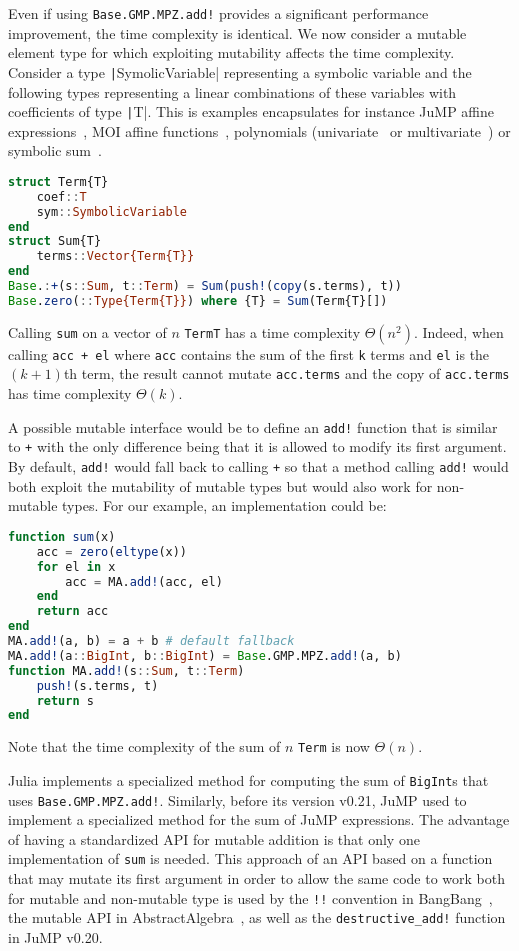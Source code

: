 \documentclass{juliacon}
\begin{document}
Even if using \lstinline|Base.GMP.MPZ.add!| provides a significant performance improvement,
the time complexity is identical.
We now consider a mutable element type for which exploiting mutability affects the time complexity.
Consider a type \texttt|SymolicVariable| representing a symbolic variable and the following types representing a linear combinations of these variables with coefficients of type \texttt|T|.
This is examples encapsulates for instance JuMP affine expressions~\cite{dunning2017jump}, MOI affine functions~\cite{legat2021mathoptinterface}, polynomials (univariate~\cite{verzani2021polynomials} or multivariate~\cite{legat2021multivariatepolynomials}) or symbolic sum~\cite{gowda2021high}.
\begin{lstlisting}[language = Julia]
struct Term{T}
    coef::T
    sym::SymbolicVariable
end
struct Sum{T}
    terms::Vector{Term{T}}
end
Base.:+(s::Sum, t::Term) = Sum(push!(copy(s.terms), t))
Base.zero(::Type{Term{T}}) where {T} = Sum(Term{T}[])
\end{lstlisting}
Calling \texttt{sum} on a vector of $n$ \texttt{Term{T}} has a time complexity $\Theta(n^2)$.
Indeed, when calling \lstinline|acc + el| where \lstinline|acc| contains the sum of the first \lstinline|k| terms and \lstinline|el| is the $(k+1)$th term,
the result cannot mutate \lstinline|acc.terms| and the copy of \lstinline|acc.terms| has time complexity $\Theta(k)$.

A possible mutable interface would be to define an \lstinline|add!| function
that is similar to \lstinline|+| with the only difference being that it
is allowed to modify its first argument.
By default, \lstinline|add!| would fall back to calling \lstinline|+|
so that a method calling \lstinline|add!| would both exploit the mutability
of mutable types but would also work for non-mutable types.
For our example, an implementation could be:
\begin{lstlisting}[language = Julia]
function sum(x)
    acc = zero(eltype(x))
    for el in x
        acc = MA.add!(acc, el)
    end
    return acc
end
MA.add!(a, b) = a + b # default fallback
MA.add!(a::BigInt, b::BigInt) = Base.GMP.MPZ.add!(a, b)
function MA.add!(s::Sum, t::Term)
    push!(s.terms, t)
    return s
end
\end{lstlisting}
Note that the time complexity of the sum of $n$ \lstinline|Term| is now $\Theta(n)$.

Julia implements a specialized method for computing the sum of \lstinline|BigInt|s that uses \lstinline|Base.GMP.MPZ.add!|.
Similarly, before its version v0.21, JuMP used to implement a specialized method for the sum of JuMP expressions.
The advantage of having a standardized API for mutable addition is that
only one implementation of \lstinline|sum| is needed.
This approach of an API based on a function that may mutate its first argument in order to allow the same code to work both for mutable and non-mutable type is
used by the \lstinline|!!| convention in BangBang~\cite{takafumi2021bangbang},
the mutable API in AbstractAlgebra~\cite{AbstractAlgebra.jl-2017},
as well as the \lstinline|destructive_add!| function in JuMP v0.20.
\end{document}
